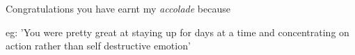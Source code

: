 \documentclass[a4, 12pt]{article}
\begin{document}
\vspace{10mm}

\Large Congratulations you have earnt my {\em accolade} because

\vspace{10mm}

eg: 'You were pretty great at staying up for days at a time
and concentrating on action rather than self destructive emotion'

\vspace{10mm}
\end{document}
